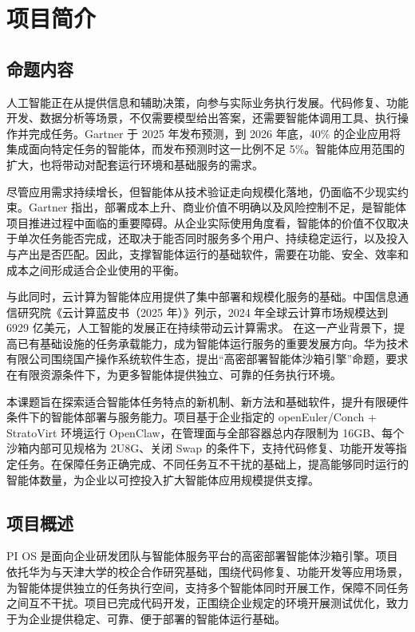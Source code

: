\chapter{项目简介}
\section{命题内容}\label{sec:2.1}
人工智能正在从提供信息和辅助决策，向参与实际业务执行发展。代码修复、功能开发、数据分析等场景，不仅需要模型给出答案，还需要智能体调用工具、执行操作并完成任务。Gartner 于 2025 年发布预测，到 2026 年底，40\% 的企业应用将集成面向特定任务的智能体，而发布预测时这一比例不足 5\%。智能体应用范围的扩大，也将带动对配套运行环境和基础服务的需求。

尽管应用需求持续增长，但智能体从技术验证走向规模化落地，仍面临不少现实约束。Gartner 指出，部署成本上升、商业价值不明确以及风险控制不足，是智能体项目推进过程中面临的重要障碍。从企业实际使用角度看，智能体的价值不仅取决于单次任务能否完成，还取决于能否同时服务多个用户、持续稳定运行，以及投入与产出是否匹配。因此，支撑智能体运行的基础软件，需要在功能、安全、效率和成本之间形成适合企业使用的平衡。

与此同时，云计算为智能体应用提供了集中部署和规模化服务的基础。中国信息通信研究院《云计算蓝皮书（2025 年）》列示，2024 年全球云计算市场规模达到 6929 亿美元，人工智能的发展正在持续带动云计算需求。 在这一产业背景下，提高已有基础设施的任务承载能力，成为智能体运行服务的重要发展方向。华为技术有限公司围绕国产操作系统软件生态，提出“高密部署智能体沙箱引擎”命题，要求在有限资源条件下，为更多智能体提供独立、可靠的任务执行环境。

本课题旨在探索适合智能体任务特点的新机制、新方法和基础软件，提升有限硬件条件下的智能体部署与服务能力。项目基于企业指定的 openEuler/\allowbreak{}Conch + StratoVirt 环境运行 OpenClaw，在管理面与全部容器总内存限制为 16GB、每个沙箱内部可见规格为 2U8G、关闭 Swap 的条件下，支持代码修复、功能开发等指定任务。在保障任务正确完成、不同任务互不干扰的基础上，提高能够同时运行的智能体数量，为企业以可控投入扩大智能体应用规模提供支撑。

\section{项目概述}\label{sec:2.2}
PI OS 是面向企业研发团队与智能体服务平台的高密部署智能体沙箱引擎。项目依托华为与天津大学的校企合作研究基础，围绕代码修复、功能开发等应用场景，为智能体提供独立的任务执行空间，支持多个智能体同时开展工作，保障不同任务之间互不干扰。项目已完成代码开发，正围绕企业规定的环境开展测试优化，致力于为企业提供稳定、可靠、便于部署的智能体运行基础。

